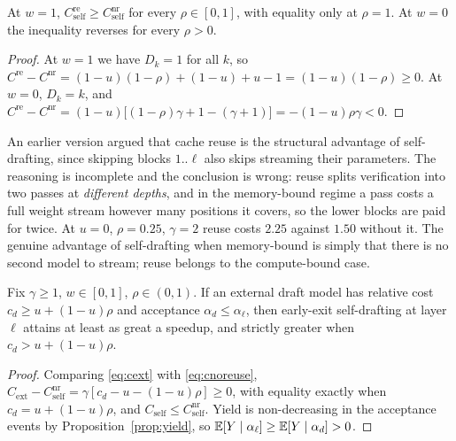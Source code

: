 \begin{proposition}
\label{prop:reuse}
At $w = 1$, $C^{\mathrm{re}}_{\mathrm{self}} \ge C^{\mathrm{nr}}_{\mathrm{self}}$
for every $\rho \in [0,1]$, with equality only at $\rho = 1$. At $w = 0$ the
inequality reverses for every $\rho > 0$.
\end{proposition}

\begin{proof}
At $w=1$ we have $D_k = 1$ for all $k$, so
$C^{\mathrm{re}} - C^{\mathrm{nr}} = (1-u)(1-\rho) + (1-u) + u - 1 = (1-u)(1-\rho) \ge 0$.
At $w=0$, $D_k = k$, and
$C^{\mathrm{re}} - C^{\mathrm{nr}} = (1-u)\big[(1-\rho)\gamma + 1 - (\gamma+1)\big]
 = -(1-u)\rho\gamma < 0$.
\end{proof}

\begin{remark}[Retraction]
\label{rem:kvreuse}
An earlier version argued that cache reuse is the structural advantage of
self-drafting, since skipping blocks $1..\ell$ also skips streaming their
parameters. The reasoning is incomplete and the conclusion is wrong: reuse
splits verification into two passes at \emph{different depths}, and in the
memory-bound regime a pass costs a full weight stream however many positions it
covers, so the lower blocks are paid for twice. At $u=0$, $\rho=0.25$,
$\gamma=2$ reuse costs $2.25$ against $1.50$ without it. The genuine advantage of
self-drafting when memory-bound is simply that there is no second model to
stream; reuse belongs to the compute-bound case.
\end{remark}

\begin{theorem}
\label{thm:dominance}
Fix $\gamma \ge 1$, $w \in [0,1]$, $\rho \in (0,1)$. If an external draft model
has relative cost $c_d \ge u + (1-u)\rho$ and acceptance
$\alpha_d \le \alpha_\ell$, then early-exit self-drafting at layer $\ell$ attains
at least as great a speedup, and strictly greater when
$c_d > u + (1-u)\rho$.
\end{theorem}

\begin{proof}
Comparing \eqref{eq:cext} with \eqref{eq:cnoreuse},
$C_{\mathrm{ext}} - C^{\mathrm{nr}}_{\mathrm{self}}
 = \gamma[c_d - u - (1-u)\rho] \ge 0$, with equality exactly when
$c_d = u + (1-u)\rho$, and $C_{\mathrm{self}} \le C^{\mathrm{nr}}_{\mathrm{self}}$.
Yield is non-decreasing in the acceptance events by
Proposition~\ref{prop:yield}, so $\mathbb{E}[Y\mid\alpha_\ell] \ge \mathbb{E}[Y\mid\alpha_d] > 0$.
\end{proof}


